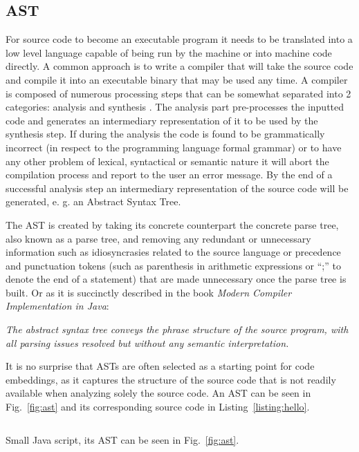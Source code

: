 \subsection{AST}

For source code to become an executable program it needs to be translated into a low level language capable of being run by the machine or into machine code directly. A common approach is to write a compiler that will take the source code and compile it into an executable binary that may be used any time. A compiler is composed of numerous processing steps that can be somewhat separated into 2 categories: analysis and synthesis \citet{batata}.
The analysis part pre-processes the inputted code and generates an intermediary representation of it to be used by the synthesis step. If during the analysis the code is found to be grammatically incorrect (in respect to the programming language formal grammar) or to have any other problem of lexical, syntactical or semantic nature it will abort the compilation process and report to the user an error message. By the end of a successful analysis step an intermediary representation of the source code will be generated, e. g. an Abstract Syntax Tree.


The AST is created by taking its concrete counterpart the concrete parse tree, also known as a parse tree, and removing any redundant or unnecessary information such as idiosyncrasies related to the source language or precedence and punctuation tokens (such as parenthesis in arithmetic expressions or ``;'' to denote the end of a statement) that are made unnecessary once the parse tree is built. 
Or as it is succinctly described in the book \textit{Modern Compiler Implementation in Java}:


\begin{myquote}
\textit{The abstract syntax tree conveys the phrase structure of the source program, with all parsing issues resolved but without any semantic interpretation.} \\\citet{java_tigre}
\end{myquote}


It is no surprise that ASTs are often selected as a starting point for code embeddings, as it captures the structure of the source code that is not readily available when analyzing solely the source code.
An AST can be seen in Fig.~\ref{fig:ast} and its corresponding source code in Listing~\ref{listing:hello}.




\begin{listing}[!ht]
\inputminted[linenos, breaklines]{java}{conteudo/code/hello.java}
\caption{Small Java script, its AST can be seen in Fig.~\ref{fig:ast}.}
\label{listing:hello}
\end{listing}



